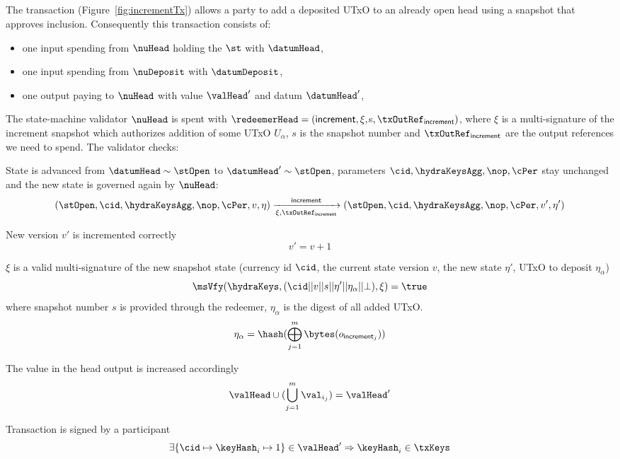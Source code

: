 \subsection{}\label{sec:increment-tx}

\noindent The \mtxIncrement{} transaction (Figure~\ref{fig:incrementTx}) allows
a party to add a deposited UTxO to an already open head using a snapshot that
approves inclusion. Consequently this transaction consists of:

\begin{itemize}
	\item one input spending from $\nuHead$ holding the $\st$ with $\datumHead$,
	\item one input spending from $\nuDeposit$ with $\datumDeposit$,
	\item one output paying to $\nuHead$ with value $\valHead'$ and
		  datum $\datumHead'$,
\end{itemize}

\noindent The state-machine validator $\nuHead$ is spent with
$\redeemerHead = (\mathsf{increment}, \xi, $s$, \txOutRef_{\mathsf{increment}})$, where $\xi$ is a multi-signature of
the increment snapshot which authorizes addition of some UTxO $U_\alpha$, $s$ is the snapshot number and $\txOutRef_{\mathsf{increment}}$ are the output references we need to spend. The
validator checks:
\begin{menumerate}
	\item State is advanced from $\datumHead \sim \stOpen$ to
	$\datumHead' \sim \stOpen$, parameters $\cid,\hydraKeysAgg,\nop,\cPer$
	stay unchanged and the new state is governed again by $\nuHead$:
	\[
		(\stOpen,\cid,\hydraKeysAgg,\nop,\cPer,v,\eta) \xrightarrow[\xi, \txOutRef_{\mathsf{increment}}]{\mathsf{increment}} (\stOpen,\cid,\hydraKeysAgg,\nop,\cPer,v',\eta')
	\]
	\item New version $v'$ is incremented correctly
	\[
		v' = v + 1
	\]
\item $\xi$ is a valid multi-signature of the new snapshot state (currency id $\cid$, the current state version $v$, the new state $\eta'$, UTxO to deposit $\eta_\alpha$)
	\[
    \msVfy(\hydraKeys,(\cid || v || s || \eta' || \eta_\alpha || \bot),\xi) = \true
	\]
  where snapshot number $s$ is provided through the redeemer, $\eta_\alpha$ is the digest of all added UTxO.
	\[
    \eta_\alpha = \hash(\bigoplus_{j=1}^m \bytes(o_{\mathsf{increment}_j}))
	\]
	\item The value in the head output is increased accordingly
	\[
		\valHead \cup (\bigcup_{j=1}^m \val_{i_{j}}) = \valHead'
	\]
	\item Transaction is signed by a participant
	\[
		\exists \{\cid \mapsto \keyHash_{i} \mapsto 1\} \in \valHead' \Rightarrow \keyHash_{i} \in \txKeys
	\]
\end{menumerate}

